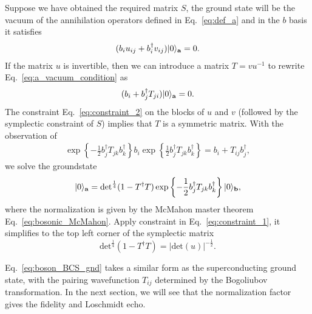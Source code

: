 Suppose we have obtained the required matrix $S$, the ground state will be the vacuum of the annihilation operators defined in Eq.~\eqref{eq:def_a} and in the $b$ basis it satisfies
\begin{equation}\begin{aligned}
\label{eq:a_vacuum_condition}
(b_iu_{ij}+b_i^\dagger v_{ij})|0\rangle_{{\bf a}}=0.
\end{aligned}\end{equation}
If the matrix $u$ is invertible, then we can introduce a matrix $T=vu^{-1}$ to rewrite Eq.~\eqref{eq:a_vacuum_condition} as
\begin{equation}\begin{aligned}
(b_i+b_j^\dagger T_{ji})|0\rangle_{{\bf a}}=0. 
\end{aligned}\end{equation}
The constraint Eq.~\eqref{eq:constraint_2} on the blocks of $u$ and $v$ (followed by the symplectic constraint of $S$) implies that $T$ is a symmetric matrix. With the observation of 
\begin{equation}\begin{aligned}
\exp\left\{-\frac{1}{2}b_j^\dagger T_{jk}b_k^\dagger\right\}b_i\exp\left\{\frac{1}{2}b_j^\dagger T_{jk}b_k^\dagger\right\}=b_i+T_{ij}b^\dagger_j,
\end{aligned}\end{equation}
we solve the groundstate
\begin{equation}\begin{aligned}
\label{eq:boson_BCS_gnd}
|0\rangle_{{\bf a}}&=\text{det}^{\frac{1}{4}}(1-T^\dagger T)\exp\left\{-\frac{1}{2}b_j^\dagger T_{jk}b_k^\dagger\right\}|0\rangle_{\bf b},\\
\end{aligned}\end{equation}
where the normalization is given by the McMahon master theorem Eq.~\eqref{eq:bosonic_McMahon}. Apply constraint in Eq.~\eqref{eq:constraint_1}, it simplifies to the top left corner of the symplectic matrix
\begin{equation}
\text{det}^{\frac{1}{4}}(1-T^\dagger T) =|\text{det}(u)|^{-\frac{1}{2}}.
\end{equation}

Eq.~\eqref{eq:boson_BCS_gnd} takes a similar form as the superconducting ground state, with the pairing wavefunction $T_{ij}$ determined by the Bogoliubov transformation. In the next section, we will see that the normalization factor gives the fidelity and Loschmidt echo.

